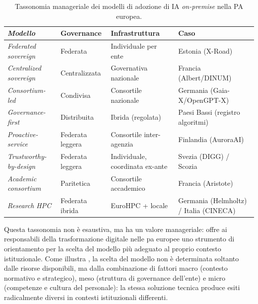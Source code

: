\begin{table}[H]
\centering
\small
\setlength{\tabcolsep}{5pt}
\caption{Tassonomia manageriale dei modelli di adozione di IA \textit{on-premise}
nella PA europea.}
\label{tab:tassonomia-modelli}
\begin{tabularx}{\textwidth}{>{\itshape}p{3.3cm} p{2.5cm} p{3.8cm} X}
\toprule
\normalfont\textbf{Modello} & \textbf{Governance} & \textbf{Infrastruttura} & \textbf{Caso} \\
\midrule
Federated sovereign    & Federata        & Individuale per ente              & Estonia (X-Road) \\[3pt]
Centralized sovereign  & Centralizzata   & Governativa nazionale             & Francia (Albert/DINUM) \\[3pt]
Consortium-led         & Condivisa       & Consortile nazionale              & Germania (Gaia-X/OpenGPT-X) \\[3pt]
Governance-first       & Distribuita     & Ibrida (regolata)                 & Paesi Bassi (registro algoritmi) \\[3pt]
Proactive-service      & Federata leggera & Consortile inter-agenzia         & Finlandia (AuroraAI) \\[3pt]
Trustworthy-by-design  & Federata leggera & Individuale, coordinata ex-ante  & Svezia (DIGG) / Scozia \\[3pt]
Academic consortium    & Paritetica      & Consortile accademico             & Francia (Aristote) \\[3pt]
Research HPC           & Federata ibrida & EuroHPC + locale                  & Germania (Helmholtz) / Italia (CINECA) \\
\bottomrule
\end{tabularx}
\end{table}

Questa tassonomia non è esaustiva, ma ha un valore manageriale: offre ai responsabili
della trasformazione digitale nelle \gls{pa} europee uno strumento di orientamento per
la scelta del modello più adeguato al proprio contesto istituzionale. Come illustra
\textcite{ValleCruzMacroMesoMicro2024}, la scelta del modello non è determinata
soltanto dalle risorse disponibili, ma dalla combinazione di fattori macro
(contesto normativo e strategico), meso (struttura di governance dell'ente) e
micro (competenze e cultura del personale): la stessa soluzione tecnica produce
esiti radicalmente diversi in contesti istituzionali differenti.

